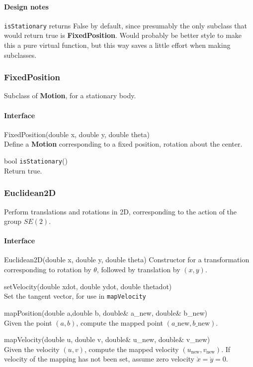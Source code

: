 \documentclass[11pt]{article}
\def\class#1{{\bf #1}} %
\def\fn#1{{\tt #1}} %
\begin{document}
\paragraph{Design notes}
\fn{isStationary} returns False by default, since presumably the only subclass that would return true is \class{FixedPosition}.  Would probably be better style to make this a pure virtual function, but this way saves a little effort when making subclasses.

\subsubsection{FixedPosition}
Subclass of \class{Motion}, for a stationary body.

\paragraph{Interface}
\begin{description}
	\item FixedPosition(double x, double y, double theta) \\
		Define a \class{Motion} corresponding to a fixed position, rotation about the center.
	\item bool \fn{isStationary}()\\
		Return true.
\end{description}
	

\subsubsection{Euclidean2D}
Perform translations and rotations in 2D, corresponding to the action of the group $SE(2)$.

\paragraph{Interface}
\begin{description}
	\item Euclidean2D(double x, double y, double theta)
		Constructor for a transformation corresponding to rotation by $\theta$, followed by translation by $(x,y)$.
	\item setVelocity(double xdot, double ydot, double thetadot) \\
		Set the tangent vector, for use in \fn{mapVelocity}
	\item mapPosition(double a,double b, double\& a\_new, double\& b\_new)\\
		Given the point $(a,b)$, compute the mapped point $(a\_\text{new},b\_\text{new})$.
	\item mapVelocity(double u, double v, double\& u\_new, double\& v\_new)\\
		Given the velocity $(u,v)$, compute the mapped velocity $(u_\text{new},v_\text{new})$.  If velocity of the mapping has not been set, assume zero velocity $\dot x = \dot y = 0$.
\end{description}
\end{document}
